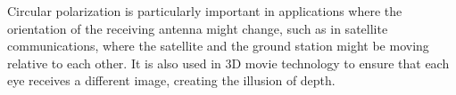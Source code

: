 Circular polarization is particularly important in applications where the orientation of the receiving antenna might change, such as in satellite communications, where the satellite and the ground station might be moving relative to each other. It is also used in 3D movie technology to ensure that each eye receives a different image, creating the illusion of depth.

